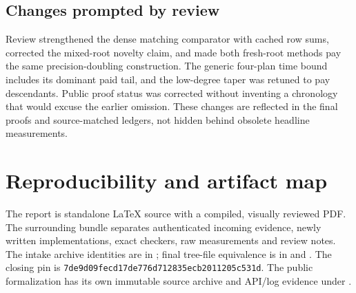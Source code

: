 \documentclass[11pt,letterpaper]{article}
\theoremstyle{remark}\newtheorem{remark}[theorem]{Remark}
\newcommand{\ClosingPin}{7de9d09fecd17de776d712835ecb2011205c531d}
\begin{document}
\subsection{Changes prompted by review}
Review strengthened the dense matching comparator with cached row sums, corrected the mixed-root novelty claim, and made both fresh-root methods pay the same precision-doubling construction. The generic four-plan time bound includes its dominant paid tail, and the low-degree taper was retuned to pay descendants. Public proof status was corrected without inventing a chronology that would excuse the earlier omission. These changes are reflected in the final proofs and source-matched ledgers, not hidden behind obsolete headline measurements.

\section{Reproducibility and artifact map}
\label{sec:repro}
The report is standalone LaTeX source with a compiled, visually reviewed PDF. The surrounding bundle separates authenticated incoming evidence, newly written implementations, exact checkers, raw measurements and review notes. The intake archive identities are in ; final tree-file equivalence is in  and . The closing pin is \texttt{\ClosingPin}. The public formalization has its own immutable source archive and API/log evidence under .
\end{document}
